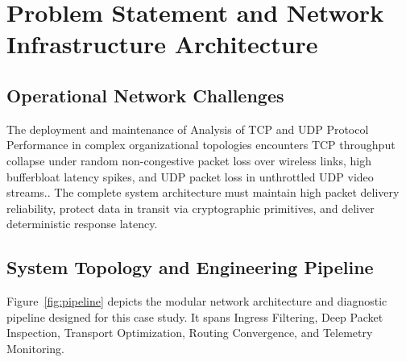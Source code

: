 \section{Problem Statement and Network Infrastructure Architecture}

\subsection{Operational Network Challenges}
The deployment and maintenance of Analysis of TCP and UDP Protocol Performance in complex organizational topologies encounters TCP throughput collapse under random non-congestive packet loss over wireless links, high bufferbloat latency spikes, and UDP packet loss in unthrottled UDP video streams.. The complete system architecture must maintain high packet delivery reliability, protect data in transit via cryptographic primitives, and deliver deterministic response latency.

\subsection{System Topology and Engineering Pipeline}
Figure~\ref{fig:pipeline} depicts the modular network architecture and diagnostic pipeline designed for this case study. It spans Ingress Filtering, Deep Packet Inspection, Transport Optimization, Routing Convergence, and Telemetry Monitoring.

